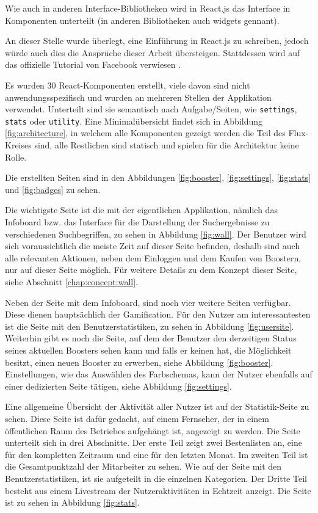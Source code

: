 \documentclass[12pt,twoside]{book}
\begin{document}
Wie auch in anderen Interface-Bibliotheken wird in React.js das Interface in Komponenten unterteilt (in anderen Bibliotheken auch widgets gennant).

An dieser Stelle wurde überlegt, eine Einführung in React.js zu schreiben, jedoch würde auch dies die Ansprüche dieser Arbeit übersteigen. Stattdessen wird auf das offizielle Tutorial von Facebook verwiesen \cite{tutorial}.

Es wurden 30 React-Komponenten erstellt, viele davon sind nicht anwendungsspezifisch und wurden an mehreren Stellen der Applikation verwendet. Unterteilt sind sie semantisch nach Aufgabe/Seiten, wie  \texttt{settings}, \texttt{stats} oder \texttt{utility}.
Eine Minimalübersicht findet sich in Abbildung \ref{fig:architecture}, in welchem alle Komponenten gezeigt werden die Teil des Flux-Kreises sind, alle Restlichen sind statisch und spielen für die Architektur keine Rolle.

Die erstellten Seiten sind in den Abbildungen \ref{fig:booster}, \ref{fig:settings}, \ref{fig:stats} und \ref{fig:badges} zu sehen.

Die wichtigste Seite ist die mit der eigentlichen Applikation, nämlich das Infoboard bzw. das Interface für die Darstellung der Suchergebnisse zu verschiedenen Suchbegriffen, zu sehen in Abbildung \ref{fig:wall}. Der Benutzer wird sich voraussichtlich die meiste Zeit auf dieser Seite befinden, deshalb sind auch alle relevanten Aktionen, neben dem Einloggen und dem Kaufen von Boostern, nur auf dieser Seite möglich. Für weitere Details zu dem Konzept dieser Seite, siehe Abschnitt \ref{chap:concept:wall}.

Neben der Seite mit dem Infoboard, sind noch vier weitere Seiten verfügbar. Diese dienen hauptsächlich der Gamification. Für den Nutzer am interessantesten ist die Seite mit den Benutzerstatistiken, zu sehen in Abbildung \ref{fig:usersite}.
Weiterhin gibt es noch die Seite, auf dem der Benutzer den derzeitigen Status seines aktuellen Boosters sehen kann und falls er keinen hat, die Möglichkeit besitzt, einen neuen Booster zu erwerben, siehe Abbildung \ref{fig:booster}. Einstellungen, wie das Auswählen des Farbschemas, kann der Nutzer ebenfalls auf einer dedizierten Seite tätigen, siehe Abbildung \ref{fig:settings}.

Eine allgemeine Übersicht der Aktivität aller Nutzer ist auf der Statistik-Seite zu sehen. Diese Seite ist dafür gedacht, auf einem Fernseher, der in einem öffentlichen Raum des Betriebes aufgehängt ist, angezeigt zu werden. Die Seite unterteilt sich in drei Abschnitte. Der erste Teil zeigt zwei Bestenlisten an, eine für den kompletten Zeitraum und eine für den letzten Monat. Im zweiten Teil ist die Gesamtpunktzahl der Mitarbeiter zu sehen. Wie auf der Seite mit den Benutzerstatistiken, ist sie aufgeteilt in die einzelnen Kategorien. Der Dritte Teil besteht aus einem Livestream der Nutzeraktivitäten in Echtzeit anzeigt. Die Seite ist zu sehen in Abbildung \ref{fig:stats}.
\end{document}
